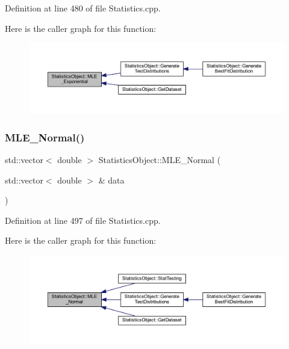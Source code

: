 Definition at line 480 of file Statistics.\+cpp.

Here is the caller graph for this function\+:\nopagebreak
\begin{figure}[H]
\begin{center}
\leavevmode
\includegraphics[width=350pt]{class_statistics_object_a39d960b11bc70f9d402b4f2fb8c31296_icgraph}
\end{center}
\end{figure}
\mbox{\label{class_statistics_object_ab81aca627b51bbe20e71ac8ded5cf666}} 
\subsubsection{\texorpdfstring{M\+L\+E\+\_\+\+Normal()}{MLE\_Normal()}}
{\footnotesize\ttfamily std\+::vector$<$ double $>$ Statistics\+Object\+::\+M\+L\+E\+\_\+\+Normal (\begin{DoxyParamCaption}\item[{std\+::vector$<$ double $>$ \&}]{data }\end{DoxyParamCaption})\hspace{0.3cm}{\ttfamily [protected]}}



Definition at line 497 of file Statistics.\+cpp.

Here is the caller graph for this function\+:\nopagebreak
\begin{figure}[H]
\begin{center}
\leavevmode
\includegraphics[width=350pt]{class_statistics_object_ab81aca627b51bbe20e71ac8ded5cf666_icgraph}
\end{center}
\end{figure}
\mbox{\label{class_statistics_object_af0888138520ad6df0c1c84cd3862c6c2}} 
